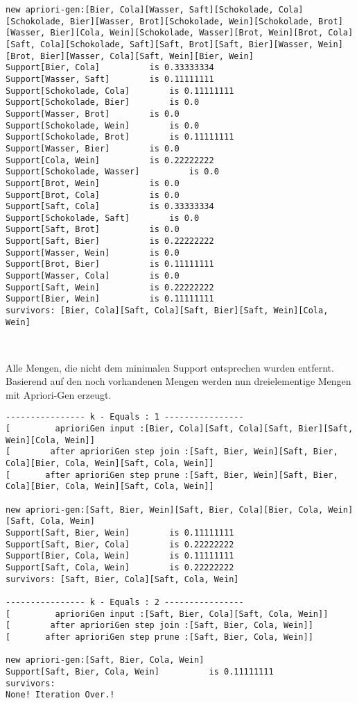 \documentclass[a4paper]{article}
\begin{document}
\begin{lstlisting}
new apriori-gen:[Bier, Cola][Wasser, Saft][Schokolade, Cola][Schokolade, Bier][Wasser, Brot][Schokolade, Wein][Schokolade, Brot][Wasser, Bier][Cola, Wein][Schokolade, Wasser][Brot, Wein][Brot, Cola][Saft, Cola][Schokolade, Saft][Saft, Brot][Saft, Bier][Wasser, Wein][Brot, Bier][Wasser, Cola][Saft, Wein][Bier, Wein]
Support[Bier, Cola] 		 is 0.33333334
Support[Wasser, Saft] 		 is 0.11111111
Support[Schokolade, Cola] 		 is 0.11111111
Support[Schokolade, Bier] 		 is 0.0
Support[Wasser, Brot] 		 is 0.0
Support[Schokolade, Wein] 		 is 0.0
Support[Schokolade, Brot] 		 is 0.11111111
Support[Wasser, Bier] 		 is 0.0
Support[Cola, Wein] 		 is 0.22222222
Support[Schokolade, Wasser] 		 is 0.0
Support[Brot, Wein] 		 is 0.0
Support[Brot, Cola] 		 is 0.0
Support[Saft, Cola] 		 is 0.33333334
Support[Schokolade, Saft] 		 is 0.0
Support[Saft, Brot] 		 is 0.0
Support[Saft, Bier] 		 is 0.22222222
Support[Wasser, Wein] 		 is 0.0
Support[Brot, Bier] 		 is 0.11111111
Support[Wasser, Cola] 		 is 0.0
Support[Saft, Wein] 		 is 0.22222222
Support[Bier, Wein] 		 is 0.11111111
survivors: [Bier, Cola][Saft, Cola][Saft, Bier][Saft, Wein][Cola, Wein]



\end{lstlisting}
Alle Mengen, die nicht dem minimalen Support entsprechen wurden entfernt. Basierend auf den noch vorhandenen Mengen werden nun dreielementige Mengen mit Apriori-Gen erzeugt.
\begin{lstlisting}
---------------- k - Equals : 1 ----------------
[ 		  aprioriGen input :[Bier, Cola][Saft, Cola][Saft, Bier][Saft, Wein][Cola, Wein]]
[ 		 after aprioriGen step join :[Saft, Bier, Wein][Saft, Bier, Cola][Bier, Cola, Wein][Saft, Cola, Wein]]
[ 		after aprioriGen step prune :[Saft, Bier, Wein][Saft, Bier, Cola][Bier, Cola, Wein][Saft, Cola, Wein]]

new apriori-gen:[Saft, Bier, Wein][Saft, Bier, Cola][Bier, Cola, Wein][Saft, Cola, Wein]
Support[Saft, Bier, Wein] 		 is 0.11111111
Support[Saft, Bier, Cola] 		 is 0.22222222
Support[Bier, Cola, Wein] 		 is 0.11111111
Support[Saft, Cola, Wein] 		 is 0.22222222
survivors: [Saft, Bier, Cola][Saft, Cola, Wein]

---------------- k - Equals : 2 ----------------
[ 		  aprioriGen input :[Saft, Bier, Cola][Saft, Cola, Wein]]
[ 		 after aprioriGen step join :[Saft, Bier, Cola, Wein]]
[ 		after aprioriGen step prune :[Saft, Bier, Cola, Wein]]

new apriori-gen:[Saft, Bier, Cola, Wein]
Support[Saft, Bier, Cola, Wein] 		 is 0.11111111
survivors: 
None! Iteration Over.!



\end{lstlisting}
\end{document}
